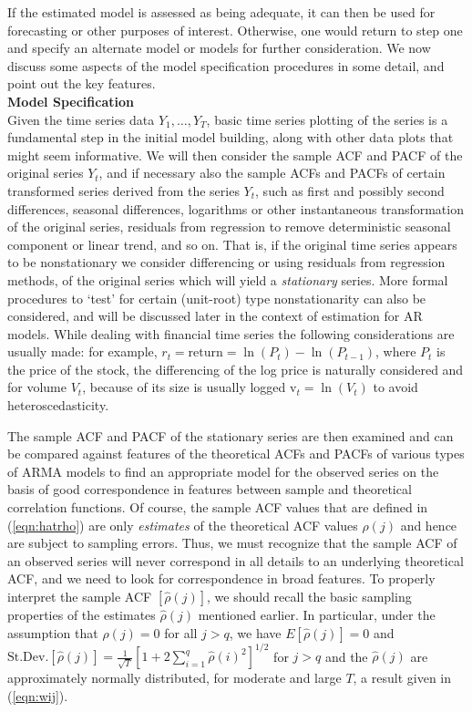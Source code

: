 If the estimated model is assessed as being adequate, it can then be used for forecasting or other purposes of interest. Otherwise, one would return to step one and specify an alternate model or models for further consideration. We now discuss some aspects of the model specification procedures in some detail, and point out the key features. \\


\noindent \textbf{Model Specification} \\


Given the time series data $Y_1,\ldots,Y_T$, basic time series  plotting of the series is a fundamental step in the initial model building, along with other data plots that might seem informative. We will then consider the sample ACF and PACF of the original series $Y_t$, and if necessary also the sample ACFs and PACFs of certain transformed series derived from the series $Y_t$, such as first and possibly second differences, seasonal differences, logarithms or other instantaneous transformation of the original series, residuals from regression to remove deterministic seasonal component or linear trend, and so on. That is, if the original time series appears to be nonstationary we consider differencing or using residuals from regression methods, of the original series which will yield a \textit{stationary} series. More formal procedures to `test' for certain (unit-root) type nonstationarity can also be considered, and will be discussed later in the context of estimation for AR models.  While dealing with financial time series the following considerations are usually made: for example, $r_t= \text{return} = \ln(P_t)-\ln(P_{t-1})$, where $P_t$ is the price of the stock, the differencing of the log price is naturally considered and for volume $V_t$, because of its size is usually logged $\text{v}_t= \ln(V_t)$ to avoid heteroscedasticity.


The sample ACF and PACF of the stationary series are then examined and can be compared against features of the theoretical ACFs and PACFs of various types of ARMA models to find an appropriate model for the observed series on the basis of good correspondence in features between sample and theoretical correlation functions. Of course, the sample ACF values that are defined in (\ref{eqn:hatrho}) are only \textit{estimates} of the theoretical ACF values $\rho(j)$ and hence are subject to sampling errors. Thus, we must recognize that the sample ACF of an observed series will never correspond in all details to an underlying theoretical ACF, and we need to look for correspondence in broad features. To properly interpret the sample ACF $[\hat{\rho}(j)]$, we should recall the basic sampling properties of the estimates $\hat{\rho}(j)$ mentioned earlier. In particular, under the assumption that $\rho(j) = 0$ for all $j > q$, we have $E[\hat{\rho}(j)]=0$ and $\text{St.Dev.}[\hat{\rho}(j)]=\frac{1}{\sqrt{T}}[1 + 2\sum_{i=1}^q\hat{\rho}(i)^2]^{1/2}$ for $j>q$ and the $\hat{\rho}(j)$ are approximately normally distributed, for moderate and large $T$, a result given in (\ref{eqn:wij}).


